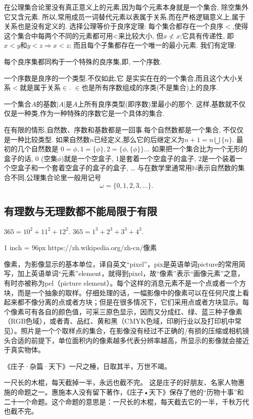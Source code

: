 \documentclass[main.tex]{subfiles}
\begin{document}
在公理集合论里没有真正意义上的元素,因为每个元素本身就是一个集合, 除空集外它又含元素. 所以,常用成员一词替代元素以表属于关系.而在严格逻辑意义上,属于关系也是没有定义的.
选择公理等价于良序定理: 每个集合都存在一个良序$<$,使得这个集合中每两个不同的元素都可用<来比较大小, 但$x\nless x$;它具有传递性, 即 $x<y$和$y<z \Rightarrow x<z$; 而且每个子集都存在一个唯一的最小元素.
我们有定理:
\begin{kaishu}每个良序集都同构于一个特殊的良序集,即,
一个序数.
\end{kaishu}一个序数是良序的一个类型.不仅如此,它
是实实在在的一个集合,而且这个大小关系$<$就是属于关系$\in$.
$\in$也是所有序数组成的序类(不是集合)上的良序.

一个集合$A$的基数$|A|$是$A$上所有良序类型(即序数)里最小的那个.
这样,基数就不仅仅是一种类,作为一种特殊的序数它是一个具体的集合.

在有限的情形,自然数、序数和基数都是一回事.每个自然数都是一个集合,
不仅仅是一种比较类型.
如果自然数$n$已经定义,那么它的后继定义为$n+1= n\bigcup \{n\}$.
最初的几个自然数是
$0 = \phi, 1 = \{\phi\}, 2 = \{\phi, \{\phi\}\}\dots$
如果把一个集合比为一个无形的盒子的话, 0 (空集$\phi$)就是一个空盒子, 1是套着一个空盒子的盒子,
2是一个装着一个空盒子和一个套着空盒子的盒子的盒子, \dots
与在数学里通常用$\mathbb{N}$表示自然数的集合不同,公理集合论里一般用记号
$$\omega = \{0, 1, 2, 3, \dots\}.$$


\subsection{有理数与无理数都不能局限于有限}

$365=10^2+11^2+12^2$.
$365=1^3+2^3+3^3+4^3$.


1 inch = 96px
https://zh.wikipedia.org/zh-cn/像素

像素，为影像显示的基本单位，译自英文“pixel”，pix是英语单词picture的常用简写，加上英语单词“元素”element，就得到pixel，故“像素”表示“画像元素”之意，有时亦被称为pel（picture element）。每个这样的消息元素不是一个点或者一个方块，而是一个抽象的取样。仔细处理的话，一幅影像中的像素可以在任何尺度上看起来都不像分离的点或者方块；但是在很多情况下，它们采用点或者方块显示。每个像素可有各自的颜色值，可采三原色显示，因而又分成红、绿、蓝三种子像素（RGB色域），或者青、品红、黄和黑（CMYK色域，印刷行业以及打印机中常见）。照片是一个个取样点的集合，在影像没有经过不正确的/有损的压缩或相机镜头合适的前提下，单位面积内的像素越多代表分辨率越高，所显示的影像就会接近于真实物体。


《庄子·杂篇·天下》一尺之棰，日取其半，万世不竭。

一尺长的木棍，每天截掉一半，永远也截不完。
这是庄子的好朋友、名家人物惠施的命题之一。惠施本人没有留下著作，《庄子•天下》保存了他的“历物十事”和二十一个命题。这个命题的意思是：一尺长的木棍，每天截去它的一半，千秋万代也截不完。
\end{document}
